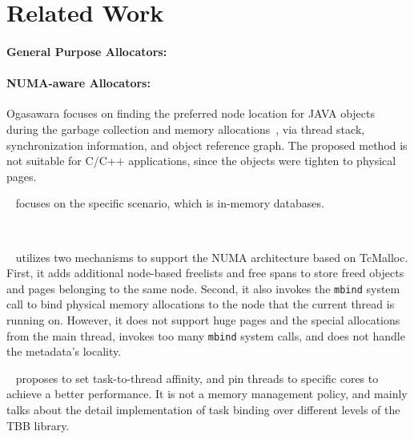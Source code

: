 \section{Related Work}

\paragraph{General Purpose Allocators:}

\paragraph{NUMA-aware Allocators:} 

Ogasawara focuses on finding the preferred node location for JAVA objects during the garbage collection and memory allocations~\cite{Ogasawara:2009:NMM:1640089.1640117}, via thread stack, synchronization information, and object reference graph. The proposed method is not suitable for C/C++ applications, since the objects were tighten to physical pages. 

~\cite{wagle2015numa} focuses on the specific scenario, which is in-memory databases. 

~\cite{kim2013node}

~\cite{tcmallocnew} utilizes two mechanisms to support the NUMA architecture based on TcMalloc. First, it adds additional node-based freelists and free spans to store freed objects and pages belonging to the same node. Second, it also invokes the \texttt{mbind} system call to bind physical memory allocations to the node that the current thread is running on.  However, it does not support huge pages and the special allocations from the main thread, invokes too many \texttt{mbind} system calls, and does not handle the metadata's locality. 






~\cite{Majo:2015:LPC:2688500.2688509} proposes to set task-to-thread affinity, and pin threads to specific cores to achieve a better performance. It is not a memory management policy, and mainly talks about the detail implementation of task binding over different levels of the TBB library. 


